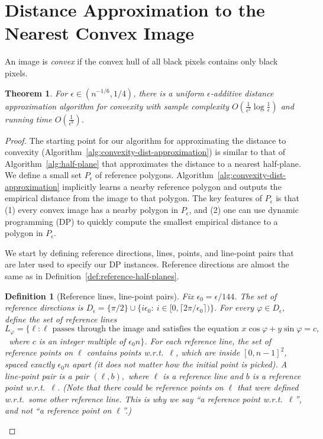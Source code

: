 \documentclass[11pt,english]{article}
\newtheorem{theorem}{Theorem}[section]
\newtheorem{definition}{Definition}[section]
\numberwithin{figure}{section}
\newcommand{\eps}{{\epsilon}}
\newcommand{\con}{144}
\newcommand{\mydelta}{\epsilon} \newcommand{\bigdelta}{{\epsilon_0}} \newcommand{\dsquares}{d_{\rm squares}}
\begin{document}
\section{Distance Approximation to the Nearest Convex Image}\label{sec:convexity}
An image is \emph{convex} if the convex hull of all black pixels contains only black pixels.
\begin{theorem}\label{thm:convexity_dist_appr}
For $\eps\in(n^{-1/6},1/4)$, there is a uniform $\mydelta$-additive distance approximation algorithm for convexity with sample complexity $O(\frac{1}{\mydelta^{2}}\log \frac 1 \mydelta)$ and running time $O(\frac 1 {\mydelta^8})$.
\end{theorem}
\begin{proof}
The starting point for our algorithm for approximating the distance to convexity (Algorithm~\ref{alg:convexity-dist-approximation}) is similar to that of Algorithm~\ref{alg:half-plane} that approximates the distance to a nearest half-plane. We define a small set $P_\mydelta$ of reference polygons. Algorithm~\ref{alg:convexity-dist-approximation} implicitly learns a nearby reference polygon and outputs the empirical distance from the image to that polygon. The key features of $P_\mydelta$ is that (1) every convex image has a nearby polygon in $P_\mydelta$, and (2) one can use dynamic programming (DP) to quickly compute the smallest empirical distance to a polygon in $P_\mydelta$.

We start by defining reference directions, lines, points, and line-point pairs that are later used to specify our DP instances.  Reference directions are almost the same as in Definition~\ref{def:reference-half-planes}.





\begin{definition}[Reference lines, line-point pairs]\label{def:reference-lines}
Fix $\bigdelta=\mydelta/\con$.  The set of {\em reference directions} is $D_\mydelta=\{\pi/2\}\cup\{i\bigdelta:~i\in [0,\lceil 2\pi/\bigdelta\rceil)\}.$
For every $\varphi\in D_\mydelta$, define the set of {\em reference lines} $L_\varphi = \{\ell : \ell \text{ passes through the image and satisfies the equation }x\cos\varphi +y\sin\varphi = c, $\ where $c$ is an integer multiple of  $\bigdelta n$$\}$.
For each reference line, the set of {\em reference points on $\ell$} contains points w.r.t.\ $\ell$, which are inside $[0,n-1]^2$, spaced exactly $\bigdelta n$  apart (it does not matter how the initial point is picked). A {\em line-point pair} is a pair $(\ell,b),$ where $\ell$ is a reference line and $b$ is a reference point w.r.t.\ $\ell$. (Note that there could be reference points on $\ell$ that were defined w.r.t.\ some other reference line. This is why we say ``a reference point w.r.t.\ $\ell$'', and not ``a reference point on $\ell$''.)
\end{definition}


\end{proof}
\end{document}
